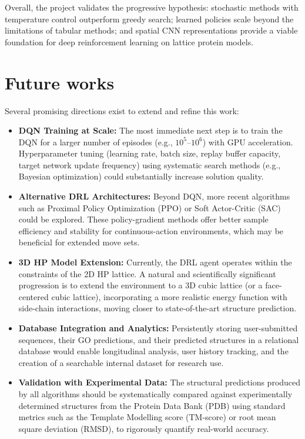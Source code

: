Overall, the project validates the progressive hypothesis: stochastic methods with temperature control outperform greedy search; learned policies scale beyond the limitations of tabular methods; and spatial CNN representations provide a viable foundation for deep reinforcement learning on lattice protein models.

\section{Future works}
\label{conclusion:futureWorks}

Several promising directions exist to extend and refine this work:

\begin{itemize}
    \item \textbf{DQN Training at Scale:} The most immediate next step is to train the DQN for a larger number of episodes (e.g., $10^5$--$10^6$) with GPU acceleration. Hyperparameter tuning (learning rate, batch size, replay buffer capacity, target network update frequency) using systematic search methods (e.g., Bayesian optimization) could substantially increase solution quality.

    \item \textbf{Alternative DRL Architectures:} Beyond DQN, more recent algorithms such as Proximal Policy Optimization (PPO) or Soft Actor-Critic (SAC) could be explored. These policy-gradient methods offer better sample efficiency and stability for continuous-action environments, which may be beneficial for extended move sets.

    \item \textbf{3D HP Model Extension:} Currently, the DRL agent operates within the constraints of the 2D HP lattice. A natural and scientifically significant progression is to extend the environment to a 3D cubic lattice (or a face-centered cubic lattice), incorporating a more realistic energy function with side-chain interactions, moving closer to state-of-the-art structure prediction.

    \item \textbf{Database Integration and Analytics:} Persistently storing user-submitted sequences, their GO predictions, and their predicted structures in a relational database would enable longitudinal analysis, user history tracking, and the creation of a searchable internal dataset for research use.

    \item \textbf{Validation with Experimental Data:} The structural predictions produced by all algorithms should be systematically compared against experimentally determined structures from the Protein Data Bank (PDB) using standard metrics such as the Template Modelling score (TM-score) or root mean square deviation (RMSD), to rigorously quantify real-world accuracy.


\end{itemize}
